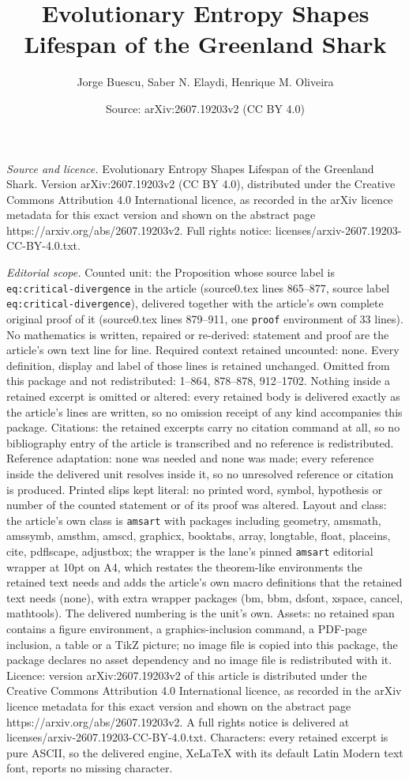 \documentclass[10pt,a4paper]{amsart}
\title[Evolutionary Entropy Shapes Lifespan of the Greenland Shark]{Evolutionary Entropy Shapes Lifespan of the Greenland Shark}
\author{Jorge Buescu, Saber N. Elaydi, Henrique M. Oliveira}
\date{Source: arXiv:2607.19203v2 (CC BY 4.0)}
\begin{document}
\maketitle

\noindent\emph{Source and licence.} Evolutionary Entropy Shapes Lifespan of the Greenland Shark. Version arXiv:2607.19203v2 (CC BY 4.0), distributed under the Creative Commons Attribution 4.0 International licence, as recorded in the arXiv licence metadata for this exact version and shown on the abstract page https://arxiv.org/abs/2607.19203v2. Full rights notice: licenses/arxiv-2607.19203-CC-BY-4.0.txt.\par\smallskip

\noindent\textit{Editorial scope.} Counted unit: the Proposition whose source label is \texttt{eq:critical-divergence} in the article (source0.tex lines 865--877, source label \texttt{eq:critical-divergence}), delivered together with the article's own complete original proof of it (source0.tex lines 879--911, one \texttt{proof} environment of 33 lines). No mathematics is written, repaired or re-derived: statement and proof are the article's own text line for line. Required context retained uncounted: none. Every definition, display and label of those lines is retained unchanged. Omitted from this package and not redistributed: 1--864, 878--878, 912--1702. Nothing inside a retained excerpt is omitted or altered: every retained body is delivered exactly as the article's lines are written, so no omission receipt of any kind accompanies this package. Citations: the retained excerpts carry no citation command at all, so no bibliography entry of the article is transcribed and no reference is redistributed. Reference adaptation: none was needed and none was made; every reference inside the delivered unit resolves inside it, so no unresolved reference or citation is produced. Printed slips kept literal: no printed word, symbol, hypothesis or number of the counted statement or of its proof was altered. Layout and class: the article's own class is \texttt{amsart} with packages including geometry, amsmath, amssymb, amsthm, amscd, graphicx, booktabs, array, longtable, float, placeins, cite, pdflscape, adjustbox; the wrapper is the lane's pinned \texttt{amsart} editorial wrapper at 10pt on A4, which restates the theorem-like environments the retained text needs and adds the article's own macro definitions that the retained text needs (none), with extra wrapper packages (bm, bbm, dsfont, xspace, cancel, mathtools). The delivered numbering is the unit's own. Assets: no retained span contains a figure environment, a graphics-inclusion command, a PDF-page inclusion, a table or a TikZ picture; no image file is copied into this package, the package declares no asset dependency and no image file is redistributed with it. Licence: version arXiv:2607.19203v2 of this article is distributed under the Creative Commons Attribution 4.0 International licence, as recorded in the arXiv licence metadata for this exact version and shown on the abstract page https://arxiv.org/abs/2607.19203v2. A full rights notice is delivered at licenses/arxiv-2607.19203-CC-BY-4.0.txt. Characters: every retained excerpt is pure ASCII, so the delivered engine, XeLaTeX with its default Latin Modern text font, reports no missing character.
\end{document}
